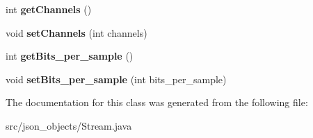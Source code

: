 \begin{DoxyCompactItemize}
\item 
\hypertarget{classjson__objects_1_1_stream_ad0ede5fe4d8c3d88031da68905974666}{
int {\bfseries getChannels} ()}
\label{classjson__objects_1_1_stream_ad0ede5fe4d8c3d88031da68905974666}

\item 
\hypertarget{classjson__objects_1_1_stream_a6f02e55dbbec6c15052a7504ebcecbbb}{
void {\bfseries setChannels} (int channels)}
\label{classjson__objects_1_1_stream_a6f02e55dbbec6c15052a7504ebcecbbb}

\item 
\hypertarget{classjson__objects_1_1_stream_a06329a676b916f72f2eab3960db1da3a}{
int {\bfseries getBits\_\-per\_\-sample} ()}
\label{classjson__objects_1_1_stream_a06329a676b916f72f2eab3960db1da3a}

\item 
\hypertarget{classjson__objects_1_1_stream_a8b00736b0d26408b7d6453cf5afabd49}{
void {\bfseries setBits\_\-per\_\-sample} (int bits\_\-per\_\-sample)}
\label{classjson__objects_1_1_stream_a8b00736b0d26408b7d6453cf5afabd49}

\end{DoxyCompactItemize}


The documentation for this class was generated from the following file:\begin{DoxyCompactItemize}
\item 
src/json\_\-objects/Stream.java\end{DoxyCompactItemize}
